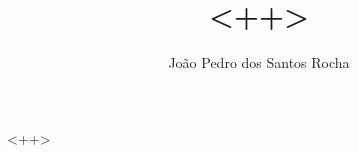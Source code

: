 \documentclass[a4paper, 12pt]{article}
\title{<++>}
\author{João Pedro dos Santos Rocha}
\begin{document}
	<++>
\end{document}
